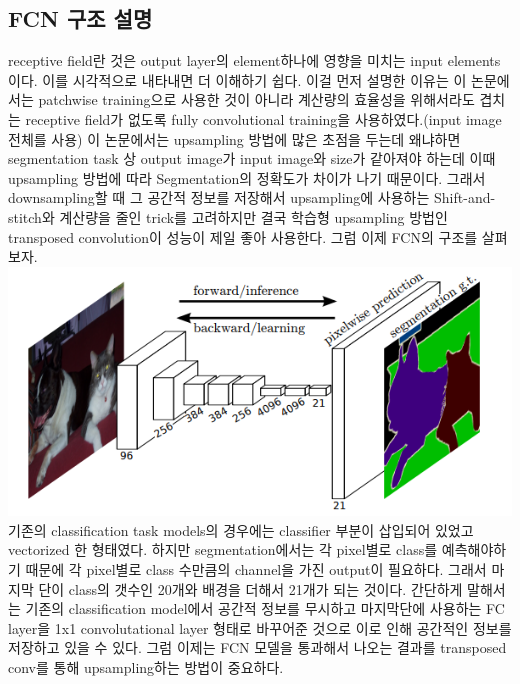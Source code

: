 \documentclass[extendedabs]{bmvc2k}
\begin{document}
 \subsection{FCN 구조 설명}
 \quad receptive field란 것은 output layer의 element하나에 영향을 미치는 input elements이다. 이를 시각적으로 내타내면 더 이해하기 쉽다. 
 이걸 먼저 설명한 이유는 이 논문에서는 patchwise training으로 사용한 것이 아니라 계산량의 효율성을 위해서라도
 겹치는 receptive field가 없도록 fully convolutional training을 사용하였다.(input image 전체를 사용) 이 논문에서는 upsampling 방법에 많은 초점을 두는데
 왜냐하면 segmentation task 상 output image가 input image와 size가 같아져야 하는데 이때 upsampling 방법에 따라 Segmentation의 정확도가 차이가 나기 때문이다.
 그래서 downsampling할 때 그 공간적 정보를 저장해서 upsampling에 사용하는 Shift-and-stitch와 계산량을 줄인 trick를 고려하지만 결국 학습형 upsampling 방법인 
 transposed convolution이 성능이 제일 좋아 사용한다. 그럼 이제 FCN의 구조를 살펴보자. 
 \newline  \includegraphics[width=\linewidth]{images/00_FCN.PNG}
 \quad 기존의 classification task models의 경우에는 classifier 부분이 삽입되어 있었고 vectorized 한 형태였다. 하지만 segmentation에서는 각 pixel별로 class를 예측해야하기
 때문에 각 pixel별로 class 수만큼의 channel을 가진 output이 필요하다. 그래서 마지막 단이 class의 갯수인 20개와 배경을 더해서 21개가 되는 것이다. 
 간단하게 말해서는 기존의 classification model에서 공간적 정보를 무시하고 마지막단에 사용하는 FC layer을 
 1x1 convolutational layer 형태로 바꾸어준 것으로 이로 인해 공간적인 정보를 저장하고 있을 수 있다. 그럼 이제는 FCN 모델을 통과해서 나오는 결과를 transposed conv를 통해 upsampling하는 방법이 중요하다. 
\end{document}
